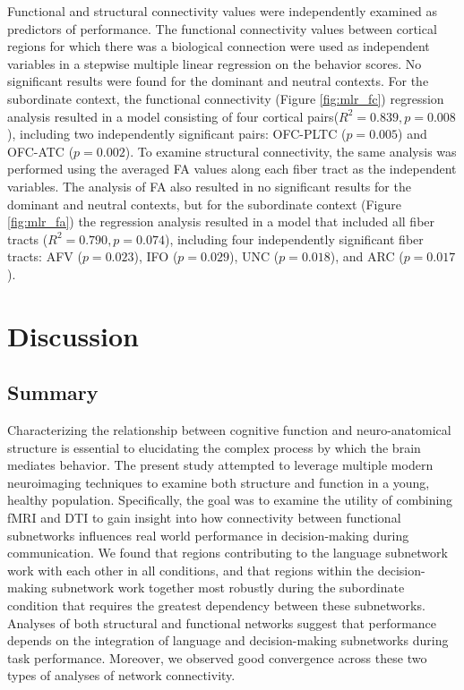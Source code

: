 \documentclass[final,authoryear,5p,times,twocolumn]{elsarticle}
\begin{document}
Functional and structural connectivity values were independently examined as predictors of performance. The functional connectivity values between cortical regions for which there was a biological connection were used as independent variables in a stepwise multiple linear regression on the behavior scores. No significant results were found for the dominant and neutral contexts. For the subordinate context, the functional connectivity (Figure \ref{fig:mlr_fc}) regression analysis resulted in a model consisting of four cortical pairs($R^2=0.839, p=0.008$), including two independently significant pairs: OFC-PLTC ($p=0.005$) and OFC-ATC ($p=0.002$). To examine structural connectivity, the same analysis was performed using the averaged FA values along each fiber tract as the independent variables.  The analysis of FA also resulted in no significant results for the dominant and neutral contexts, but for the subordinate context (Figure \ref{fig:mlr_fa}) the regression analysis resulted in a model that included all fiber tracts ($R^2=0.790, p=0.074$), including four independently significant fiber tracts: AFV ($p=0.023$), IFO ($p=0.029$), UNC ($p=0.018$), and ARC ($p=0.017$).

\section{Discussion}

\subsection{Summary}
Characterizing the relationship between cognitive function and neuro-anatomical structure is essential to elucidating the complex process by which the brain mediates behavior. The present study attempted to leverage multiple modern neuroimaging techniques to examine both structure and function in a young, healthy population. Specifically, the goal was to examine the utility of combining fMRI and DTI to gain insight into how connectivity between functional subnetworks influences real world performance in decision-making during communication. We found that regions contributing to the language subnetwork work with each other in all conditions, and that regions within the decision-making subnetwork work together most robustly during the subordinate condition that requires the greatest dependency between these subnetworks. Analyses of both structural and functional networks suggest that performance depends on the integration of language and decision-making subnetworks during task performance. Moreover, we observed good convergence across these two types of analyses of network connectivity.
\end{document}
